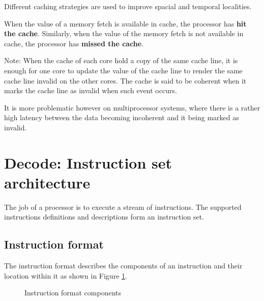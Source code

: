 \documentclass{report}
\begin{document}
Different caching strategies are used to improve spacial and temporal
localities.

When the value of a memory fetch is available in cache, the processor has
\textbf{hit the cache}. Similarly, when the value of the memory fetch is not
available in cache, the processor has \textbf{missed the cache}.

Note: When the cache of each core hold a copy of the same cache line, it is
enough for one core to update the value of the cache line to render the same
cache line invalid on the other cores. The cache is said to be coherent when it
marks the cache line as invalid when such event occurs.

It is more problematic however on multiprocessor systems, where there is a
rather high latency between the data becoming incoherent and it being marked as
invalid.



\section{Decode: Instruction set architecture}

The job of a processor is to execute a stream of instructions. The supported
instructions definitions and descriptions form an instruction set.



\subsection{Instruction format}

The instruction format describes the components of an instruction and their
location within it as shown in Figure \ref{fig:instruction-format-components}.

\begin {figure}[H]
\centering
{}
\caption {Instruction format components}
\label {fig:instruction-format-components}
\end {figure}
\end{document}
